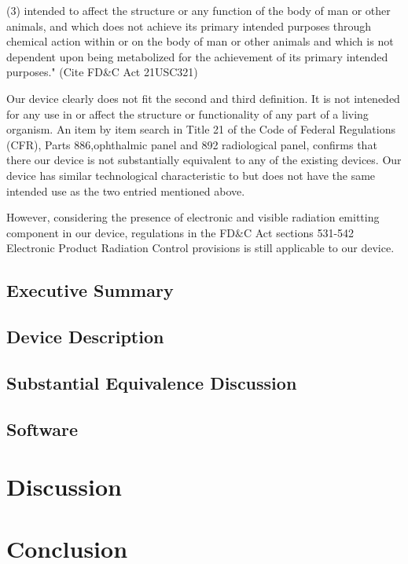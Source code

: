 \documentclass{article}
\begin{document}
(3) intended to affect the structure or any function of the body of
man or other animals, and which does not achieve its primary intended
purposes through chemical action within or on the body of man or other
animals and which is not dependent upon being metabolized for the
achievement of its primary intended purposes." (Cite FD\&C Act
21USC321)

Our device clearly does not fit the second and third definition. It is
not inteneded for any use in or affect the structure or functionality
of any part of a living organism. An item by item search in Title 21
of the Code of Federal Regulations (CFR), Parts 886,ophthalmic panel
and 892 radiological panel, confirms that there our device is not
substantially equivalent to any of the existing devices. Our device
has similar technological characteristic to but does not have the same
intended use as the two entried mentioned above.

However, considering the presence of electronic and visible radiation
emitting component in our device, regulations in the FD\&C Act
sections 531-542 Electronic Product Radiation Control provisions is
still applicable to our device.










\setcounter{subsection}{0}
\subsection{Executive Summary}
\subsection{Device Description}
\subsection{Substantial Equivalence Discussion}





\subsection{Software}




\section{Discussion}
\label{sec:discussion}

\section{Conclusion}
\label{sec:conclusion}


\newpage
{}


\end{document}
